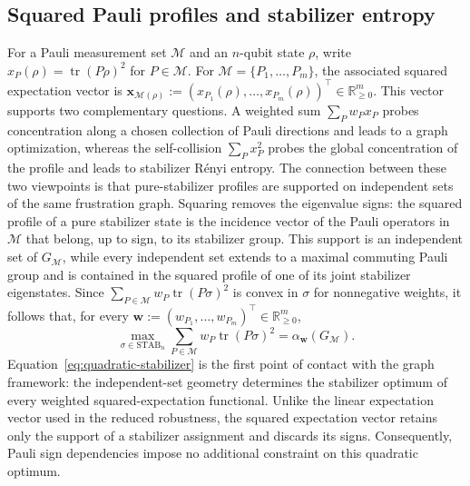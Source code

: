 \documentclass[10pt,aps,pra,twocolumn,floatfix,nofootinbib,superscriptaddress,longbibliography]{revtex4-2}
\newcommand{\Mcal}{\mathcal M}
\newcommand{\STAB}{\mathrm{STAB}}
\renewcommand{\tr}{\operatorname{tr}}
\providecommand{\mathbm}[1]{\bm{#1}}
\begin{document}
\begin{bibunit}[apsrev4-2]
		
		
		
		
		
		
			
		
		
			
			
		
		
		
		
		\section{Squared Pauli profiles and stabilizer entropy}
		\label{app:sre}
		
		For a Pauli measurement set $\Mcal$ and an $n$-qubit state $\rho$, write $x_P(\rho)=\tr(P\rho)^2$ for $P\in\Mcal$.
		For $\Mcal=\{P_1,\ldots,P_m\}$, the associated squared expectation vector is $\mathbm{x}_{\Mcal(\rho)}:=(x_{P_1}(\rho),\ldots,x_{P_m}(\rho))^\top\in\mathbb{R}_{\ge0}^m$. This vector supports two complementary questions. A weighted sum $\sum_Pw_Px_P$ probes concentration along a chosen collection of Pauli directions and leads to a graph optimization, whereas the self-collision $\sum_Px_P^2$ probes the global concentration of the profile and leads to stabilizer R\'enyi entropy. The connection between these two viewpoints is that pure-stabilizer profiles are supported on independent sets of the same frustration graph.
		Squaring removes the eigenvalue signs: the squared profile of a pure stabilizer state is the incidence vector of the Pauli operators in $\Mcal$ that belong, up to sign, to its stabilizer group.
		This support is an independent set of $G_\Mcal$, while every independent set extends to a maximal commuting Pauli group and is contained in the squared profile of one of its joint stabilizer eigenstates.
		Since $\sum_{P\in\Mcal}w_P\tr(P\sigma)^2$ is convex in $\sigma$ for nonnegative weights, it follows that, for every $\mathbm{w}:=(w_{P_1},\ldots,w_{P_m})^\top\in\mathbb{R}_{\ge0}^m$,
		\begin{equation}
			\max_{\sigma\in\STAB_n}\sum_{P\in\Mcal}w_P\tr(P\sigma)^2=\alpha_{\mathbm{w}}(G_\Mcal).
			\label{eq:quadratic-stabilizer}
		\end{equation}
		Equation~\eqref{eq:quadratic-stabilizer} is the first point of contact with the graph framework: the independent-set geometry determines the stabilizer optimum of every weighted squared-expectation functional. Unlike the linear expectation vector used in the reduced robustness, the squared expectation vector retains only the support of a stabilizer assignment and discards its signs. Consequently, Pauli sign dependencies impose no additional constraint on this quadratic optimum.
		

\end{bibunit}
\end{document}
